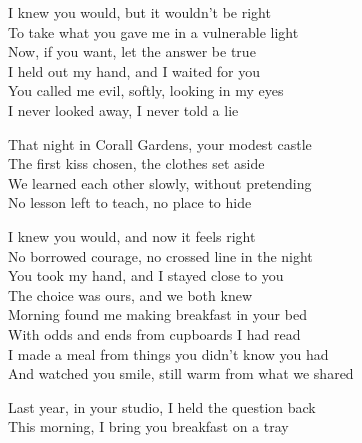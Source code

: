 \begin{lyrics}
I knew you would, but it wouldn’t be right\\
To take what you gave me in a vulnerable light\\
Now, if you want, let the answer be true\\
I held out my hand, and I waited for you\\
You called me evil, softly, looking in my eyes\\
I never looked away, I never told a lie

That night in Corall Gardens, your modest castle\\
The first kiss chosen, the clothes set aside\\
We learned each other slowly, without pretending\\
No lesson left to teach, no place to hide

I knew you would, and now it feels right\\
No borrowed courage, no crossed line in the night\\
You took my hand, and I stayed close to you\\
The choice was ours, and we both knew\\
Morning found me making breakfast in your bed\\
With odds and ends from cupboards I had read\\
I made a meal from things you didn’t know you had\\
And watched you smile, still warm from what we shared

Last year, in your studio, I held the question back\\
This morning, I bring you breakfast on a tray
\end{lyrics}

